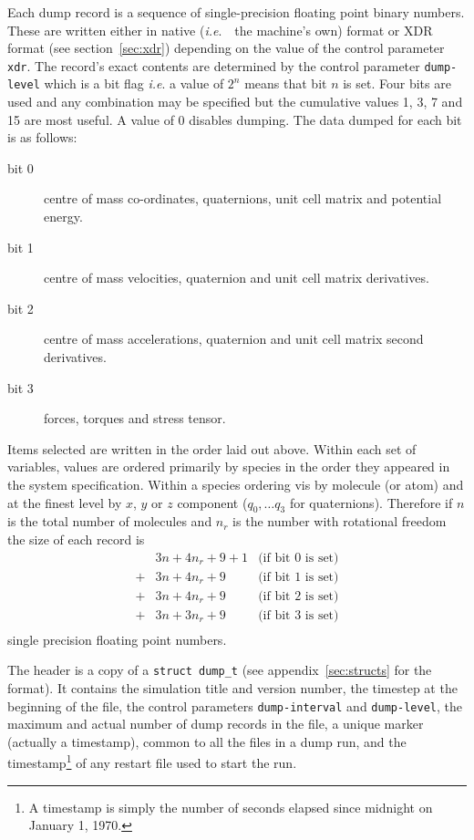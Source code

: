 \documentclass[twoside]{report}
\newcommand{\ie}{{\em i.e}.\ }
\begin{document}
Each dump record is a sequence of single-precision floating point
binary numbers.  These are written either in native (\ie\ the
machine's own) format or XDR format (see section~\ref{sec:xdr})
depending on the value of the control parameter \texttt{xdr}.  The
record's exact contents are determined by the control parameter
\texttt{dump-level} which is a bit flag {\em i.e}. a value of $2^{n}$
means that bit $n$ is set.  Four bits are used and any combination may
be specified but the cumulative values 1, 3, 7 and 15 are most
useful.  A value of 0 disables dumping. The data dumped for each bit
is as follows:
\begin{description}
\item[bit 0]    centre of mass co-ordinates, quaternions, unit cell matrix 
and potential energy.         
\item[bit 1]    centre of mass velocities, quaternion and unit cell
matrix derivatives.
\item[bit 2]    centre of mass accelerations, quaternion and unit cell
matrix second derivatives.
\item[bit 3]    forces, torques and stress tensor.
\end{description}
Items selected are written in the order laid out above.  Within each
set of variables, values are ordered primarily by species in the order
they appeared in the system specification.  Within a species ordering
vis by molecule (or atom) and at the finest level by $x$, $y$ or $z$
component ($q_{0}, \ldots q_{3}$ for quaternions). Therefore if $n$ is
the total number of molecules and $n_{r}$ is the number with
rotational freedom the size of each record is
\begin{displaymath}
\begin{array}{cll}
   & 3n + 4n_{r} + 9 + 1 & \mbox{(if bit 0 is set)} \\
 + & 3n + 4n_{r} + 9 & \mbox{(if bit 1 is set)} \\
 + & 3n + 4n_{r} + 9 & \mbox{(if bit 2 is set)} \\
 + & 3n + 3n_{r} + 9 & \mbox{(if bit 3 is set)} \\
\end{array}
\end{displaymath}
single precision floating point numbers.

The header is a copy of a \texttt{struct dump\_t} (see
appendix~\ref{sec:structs} for the format). It contains the simulation
title and version number, the timestep at the beginning of the file,
the control parameters \texttt{dump-interval} and \texttt{dump-level}, the
maximum and actual number of dump records in the file, a unique marker
(actually a timestamp), common to all the files in a dump run, and the
timestamp\footnote{A timestamp is simply the number of seconds elapsed
since midnight on January 1, 1970.} of any restart file used to start
the run.
\end{document}
